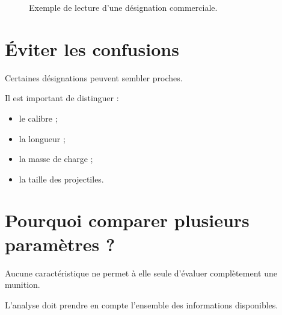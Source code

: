 \begin{figure}[htbp]
\centering


\caption{Exemple de lecture d'une désignation commerciale.}
\label{fig:lecture_designation_complete}

\end{figure}

\section{Éviter les confusions}

Certaines désignations peuvent sembler proches.

Il est important de distinguer :

\begin{itemize}
    \item le calibre ;
    \item la longueur ;
    \item la masse de charge ;
    \item la taille des projectiles.
\end{itemize}

\section{Pourquoi comparer plusieurs paramètres ?}

Aucune caractéristique ne permet à elle seule d'évaluer complètement une
munition.

L'analyse doit prendre en compte l'ensemble des informations disponibles.

